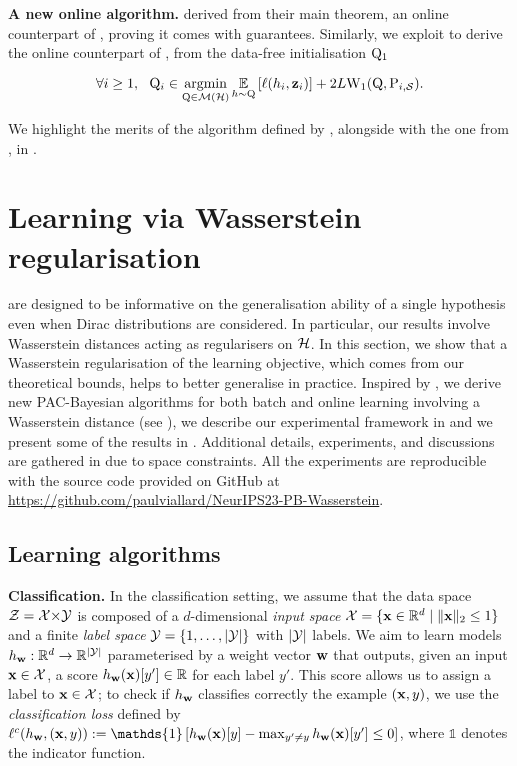 \textbf{A new online algorithm.}
 derived from their main theorem, an online counterpart of , proving it comes with guarantees.
Similarly, we exploit  to derive the online counterpart of , from the data-free initialisation $\mathrm{Q}_1$

\begin{equation}
    \label{eq:online-alg}
    \forall i \geq 1,\ \ \mathrm{Q}_i \in \operatorname*{\mathrm{argmin}}_{\mathrm{Q}\in\mathcal{M}(\mathcal{H})} \operatorname*{\mathbb{E}}_{h\sim \mathrm{Q}}\left[\ell(h_i, \mathbf{z}_i)\right] + 2L\mathrm{W}_{1}(\mathrm{Q}, \mathrm{P}_{i,\mathcal{S}}).
\end{equation}

We highlight the merits of the algorithm defined by , alongside with the one from , in .

\section{Learning via Wasserstein regularisation}
\label{sec:experiments}

 are designed to be informative on the generalisation ability of a single hypothesis even when Dirac distributions are considered.
In particular, our results involve Wasserstein distances acting as regularisers on $\mathcal{H}$. 
In this section, we show that a Wasserstein regularisation of the learning objective, which comes from our theoretical bounds, helps to better generalise in practice.
Inspired by , we derive new PAC-Bayesian algorithms for both batch and online learning involving a Wasserstein distance (see ), we describe our experimental framework in  and we present some of the results in .
Additional details, experiments, and discussions are gathered in  due to space constraints. 
All the experiments are reproducible with the source code provided on GitHub at \url{https://github.com/paulviallard/NeurIPS23-PB-Wasserstein}.

\subsection{Learning algorithms}
\label{sec:algo}

\textbf{Classification.} 
In the classification setting, we assume that the data space $\mathcal{Z}=\mathcal{X}{\times}\mathcal{Y}$ is composed of a $d$-dimensional \textit{input space} $\mathcal{X}=\{ \mathbf{x} \in \mathbb{R}^d \;|\; \|\mathbf{x}\|_2 \le 1 \}$ and a finite \textit{label space} $\mathcal{Y}=\{1,\dots, |\mathcal{Y}|\}$ with $|\mathcal{Y}|$ labels.
We aim to learn models $h_{\mathbf{w}}: \mathbb{R}^d\to \mathbb{R}^{|\mathcal{Y}|}$ parameterised by a weight vector $\mathbf{w}$ that outputs, given an input $\mathbf{x}\in\mathcal{X}$, a score $h_{\mathbf{w}}(\mathbf{x})[y'] \in \mathbb{R}$ for each label $y'$. 
This score allows us to assign a label to $\mathbf{x}\in\mathcal{X}$; to check if $h_{\mathbf{w}}$ classifies correctly the example $(\mathbf{x}, y)$, we use the {\it classification loss} defined by $\loss^{c}(h_{\wbf}, (\x, y)) \defeq \mathds{1}\left[ h_{\wbf}(\x)[y] - \max_{y'\ne y} h_{\wbf}(\x)[y'] \le 0 \right]$, where $\mathds{1}$ denotes the indicator function.

